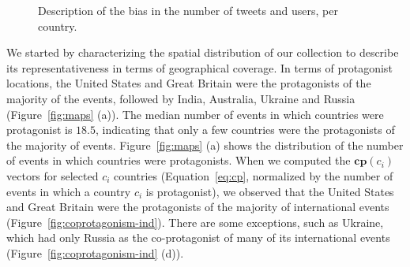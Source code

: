 \begin{figure}[t]
\centering
{}%

%
\caption{Description of the bias in the number of tweets and users, per country.}\label{fig:tweets-per}
\end{figure}



We started by characterizing the spatial distribution of our collection to
describe its representativeness in terms of geographical coverage. 
%
In terms of protagonist locations, the United States and Great Britain were the
protagonists of the majority of the events, followed by India, Australia,
Ukraine and Russia (Figure~\ref{fig:maps} (a)). 
%
The median number of events in which countries were protagonist is $18.5$,
indicating that only a few countries were the protagonists of the majority of
events. 
%
Figure~\ref{fig:maps} (a) shows the distribution of the number of events in
which countries were protagonists. 
%
When we computed the $\mathbf{cp}(c_i)$ vectors for selected $c_i$ countries
(Equation~\ref{eq:cp}, normalized by the number of events in which a country
$c_i$ is protagonist), we observed that the United States and Great Britain were
the protagonists of the majority of international events
(Figure~\ref{fig:coprotagonism-ind}). 
%
There are some exceptions, such as Ukraine, which had only Russia as the
co-protagonist of many of its international events
(Figure~\ref{fig:coprotagonism-ind} (d)).

